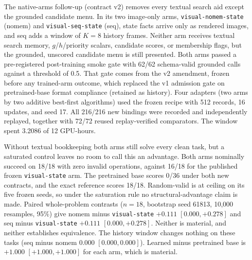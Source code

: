 The native-arms follow-up (contract v2) removes every textual search aid except the grounded candidate menu. In its two image-only arms, \texttt{visual-nomem-state} (nomem) and \texttt{visual-seq-state} (seq), state facts arrive only as rendered images, and seq adds a window of $K{=}8$ history frames. Neither arm receives textual search memory, $g$/$h$/priority scalars, candidate scores, or membership flags, but the grounded, unscored candidate menu is still presented. Both arms passed a pre-registered post-training smoke gate with 62/62 schema-valid grounded calls against a threshold of 0.5. That gate comes from the v2 amendment, frozen before any trained-arm outcome, which replaced the v1 admission gate on pretrained-base format compliance (retained as history). Four adapters (two arms by two additive best-first algorithms) used the frozen recipe with 512 records, 16 updates, and seed 17. All 216/216 new bindings were recorded and independently replayed, together with 72/72 reused replay-verified comparators. The window spent 3.2086 of 12 GPU-hours.

Without textual bookkeeping both arms still solve every clean task, but a saturated control leaves no room to call this an advantage. Both arms nominally succeed on 18/18 with zero invalid operations, against 16/18 for the published frozen \texttt{visual-state} arm. The pretrained base scores 0/36 under both new contracts, and the exact reference scores 18/18. Random-valid is at ceiling on its five frozen seeds, so under the saturation rule no structural-advantage claim is made. Paired whole-problem contrasts ($n{=}18$, bootstrap seed 61813, 10,000 resamples, 95\%) give nomem minus \texttt{visual-state} $+0.111$ $[0.000, +0.278]$ and seq minus \texttt{visual-state} $+0.111$ $[0.000, +0.278]$. Neither is material, and neither establishes equivalence. The history window changes nothing on these tasks (seq minus nomem $0.000$ $[0.000, 0.000]$). Learned minus pretrained base is $+1.000$ $[+1.000, +1.000]$ for each arm, which is material.


